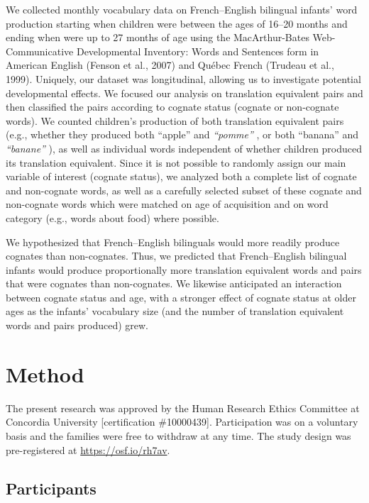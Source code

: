 \documentclass[
  english,
  ,man,floatsintext]{apa6}
\begin{document}
We collected monthly vocabulary data on French--English bilingual infants' word production starting when children were between the ages of 16--20 months and ending when were up to 27 months of age using the MacArthur-Bates Web-Communicative Developmental Inventory: Words and Sentences form in American English (Fenson et al., 2007) and Québec French (Trudeau et al., 1999). Uniquely, our dataset was longitudinal, allowing us to investigate potential developmental effects. We focused our analysis on translation equivalent pairs and then classified the pairs according to cognate status (cognate or non-cognate words). We counted children's production of both translation equivalent pairs (e.g., whether they produced both ``apple''  and \emph{``pomme''} , or both ``banana''  and \emph{``banane''} ), as well as individual words independent of whether children produced its translation equivalent. Since it is not possible to randomly assign our main variable of interest (cognate status), we analyzed both a complete list of cognate and non-cognate words, as well as a carefully selected subset of these cognate and non-cognate words which were matched on age of acquisition and on word category (e.g., words about food) where possible.

We hypothesized that French--English bilinguals would more readily produce cognates than non-cognates. Thus, we predicted that French--English bilingual infants would produce proportionally more translation equivalent words and pairs that were cognates than non-cognates. We likewise anticipated an interaction between cognate status and age, with a stronger effect of cognate status at older ages as the infants' vocabulary size (and the number of translation equivalent words and pairs produced) grew.

\hypertarget{method}{%
\section{Method}\label{method}}

The present research was approved by the Human Research Ethics Committee at Concordia University {[}certification \#10000439{]}. Participation was on a voluntary basis and the families were free to withdraw at any time. The study design was pre-registered at \url{https://osf.io/rh7av}.

\hypertarget{participants}{%
\subsection{Participants}\label{participants}}
\end{document}
